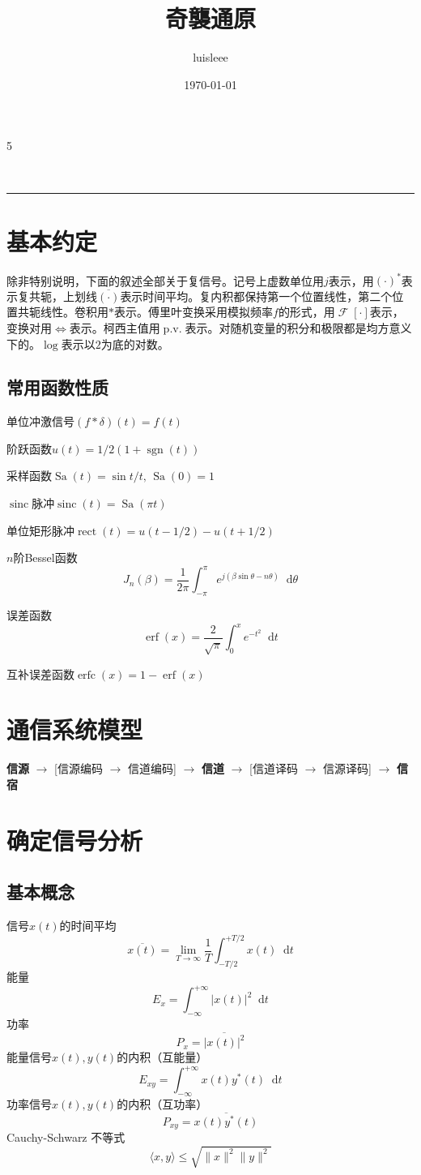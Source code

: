 \documentclass[8pt, a4paper]{extarticle}
\title{奇襲通原\ding{43}}
\author{luisleee}
\date{\today}
\makeatletter
\newcommand*{\dif}{\mathop{}\!\mathrm{d}}
\DeclareMathOperator{\sinc}{sinc}
\DeclareMathOperator{\Sa}{Sa}
\DeclareMathOperator{\rect}{rect}
\DeclareMathOperator{\pv}{p.v.}
\DeclareMathOperator{\sgn}{sgn}
\DeclareMathOperator{\fourier}{\mathcal{F}}
\DeclareMathOperator{\erf}{erf}
\DeclareMathOperator{\erfc}{erfc}
\renewcommand{\maketitle}{
  \begin{center}
    \vspace{-2.5em} 
    
    {\Large \bfseries \@title} \\[0.4ex] 
    
    {\scriptsize \@author \quad \text{|} \quad \@date} 
    
    \vspace{0.2ex}
    \hrule 
    
    \vspace{-1.0em} 
  \end{center}
}
\makeatother
\begin{document}
\small
\begin{multicols}{5}

\maketitle
\section{基本约定}
除非特别说明，下面的叙述全部关于复信号。记号上虚数单位用\(j\)表示，用\({(\cdot)}^*\)表示复共轭，上划线\(\overline{(\cdot)}\)表示时间平均。复内积都保持第一个位置线性，第二个位置共轭线性。卷积用\(\ast\)表示。傅里叶变换采用模拟频率\(f\)的形式，用\(\fourier[\cdot]\)表示，变换对用\(\Leftrightarrow\)表示。柯西主值用\(\pv\)表示。对随机变量的积分和极限都是均方意义下的。\(\log\)表示以\(2\)为底的对数。
\subsection{常用函数性质}
单位冲激信号\((f\ast \delta)(t)=f(t)\)

阶跃函数\(u(t) = 1/2(1+\sgn(t))\)

采样函数\(\Sa(t) =\sin t/t,\, \Sa(0)=1\)

\(\sinc\)脉冲\(\sinc(t) = \Sa(\pi t)\)

单位矩形脉冲\(\rect(t) = u(t-1/2)-u(t+1/2)\)

\(n\)阶Bessel函数
\[
J_n(\beta)=\frac{1}{2\pi}\int_{-\pi}^{\pi}e^{j(\beta\sin\theta-n\theta)}\dif \theta
\]

误差函数
\[
\erf(x)=\frac{2}{\sqrt{\pi}}\int_{0}^{x}e^{-t^2}\dif t
\]

互补误差函数\(\erfc(x)=1-\erf(x)\)
\section{通信系统模型}
\textbf{信源} $\to$ [信源编码 $\to$ 信道编码] $\to$ \textbf{信道} $\to$ [信道译码 $\to$ 信源译码] $\to$ \textbf{信宿}
\section{确定信号分析}
\subsection{基本概念}
信号\(x(t)\)的时间平均
\[
\overline{x(t)} = \lim_{T\to\infty}\frac{1}{T}\int_{-T/2}^{+T/2}x(t)\dif t
\]
能量
\[
E_x = \int_{-\infty}^{+\infty}|x(t)|^2\dif t
\]
功率
\[
P_x = \overline{|x(t)|^2}
\]
能量信号\(x(t),y(t)\)的内积（互能量）
\[
E_{xy} =\int_{-\infty}^{+\infty}x(t)y^*(t)\dif t
\]
功率信号\(x(t),y(t)\)的内积（互功率）
\[
P_{xy} = \overline{x(t)y^*(t)}
\]
Cauchy-Schwarz 不等式
\[
\langle x,y\rangle \leq \sqrt{\|x\|^2\|y\|^2}
\]

\end{multicols}
\end{document}
